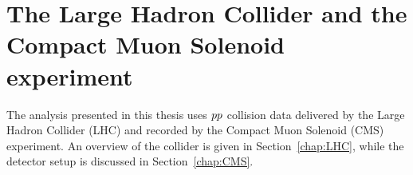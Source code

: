\chapter[The LHC and the CMS experiment]{The Large Hadron Collider and the Compact Muon Solenoid
experiment \label{chap:LHC_CMS}}

The analysis presented in this thesis uses ${p}{p}$ collision data delivered by the Large Hadron
Collider (LHC) and recorded by the Compact Muon Solenoid (CMS) experiment. An overview of the
collider is given in Section~\ref{chap:LHC}, while the detector setup is discussed in
Section~\ref{chap:CMS}.



